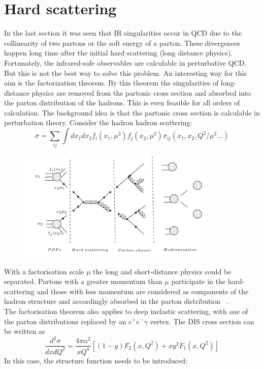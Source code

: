 \section{Hard scattering}
\label{Hard scattering}
In the last section it was seen that IR singularities occur in QCD due to the collinearity of two partons or the soft energy of a parton. These divergences happen long time after the initial hard scattering (long distance physics). Fortunately, the infrared-safe observables are calculable in perturbative QCD.  But this is not the best way to solve this problem. An interesting way for this aim is the factorization theorem. By this theorem the singularities of long-distance physics are removed from the partonic cross section and absorbed into the parton distribution of the hadrons. This is even feasible for all orders of calculation. The background idea is that the partonic cross section is calculable in perturbation theory. 
Consider the hadron hadron scattering:
\begin{equation}
\sigma = \sum_{ij} \int dx_1 dx_2 f_i(x_1, \mu^2)f_j(x_2, \mu^2) \sigma_{ij}(x_1, x_2, Q^2/\mu^2... )
\end{equation}
\begin{figure}[h!]
\centering
\includegraphics[width=0.85\textwidth]{images/Intro/Hard.png}
\end{figure}
With a factorisation scale $ \mu $ the long and short-distance physics could be separated. Partons with a greater momentum than $ \mu $ participate in the hard-scattering and those with less momentum are considered as components of the hadron structure and accordingly absorbed in the parton distribution ~\cite{Nagy:2006kb}.\\
The factorisation theorem also applies to deep inelastic scattering,
with one of the parton distributions replaced by an $ e^+ e^- \gamma $ vertex. The DIS cross section can be written as ~\cite{Ellis:1991qj}
\begin{equation}
\frac{d^2 \sigma}{dx dQ^2}=\frac{4\pi \alpha^2}{x Q^4}[(1-y)F_2 (x, Q^2)+xy^2 F_1(x, Q^2)]
\end{equation}
In this case, the structure function needs to be introduced: 

